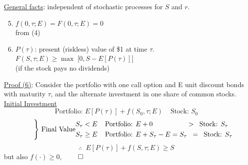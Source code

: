 \documentclass[
14pt,notheorems,hyperref={pdfauthor=whatever}
]{beamer}
\begin{document}
\begin{frame}
\underline{General facts}: independent of stochastic processes for $S$ and $r$.\\
\hfill
\begin{enumerate}
    \setcounter{enumi}{4}
    \item $f(0,\tau;E) = F(0,\tau;E) = 0$\\
    from (4)\\
    \hfill
    \item $P(\tau)$: present (riskless) value of \$1 at time $\tau$.\\
    $F(S,\tau;E) \geq \max\;\bigg[0,S-E[P(\tau)]\bigg]$\\
    (if the stock pays no dividends)\\
\end{enumerate}
\hfill\break
\end{frame}

\begin{frame}
\underline{Proof (6)}: Consider the portfolio with one call option and E unit discount bonds with maturity $\tau$, and the alternate investment in one share of common stocks.\\
\hfill\break
\underline{Initial Investment}
\[\text{Portfolio: } E[P(\tau)]+f(S_0,\tau;E) \;\;\;\; \text{Stock: } S_0\]
\begin{align*} \tag*{\Bigg\} Final Value}
\begin{split}
    S_\tau &< E \;\;\;\; \text{Portfolio: } E+0 \;\;\;\;\;\;\;\;\;\;\;\;\;\;\;\;\;\;>\;\; \text{Stock: } S_\tau
    \\
    S_\tau &\geq E \;\;\;\; \text{Portfolio: } E+S_\tau-E=S_\tau \;\;=\;\; \text{Stock: } S_\tau
\end{split}
\end{align*}
\[\therefore \;\; E[P(\tau)]+f(S,\tau;E) \geq S\]
but also $f(\cdot) \geq 0$, \hfill$\qed$\\
\end{frame}
\end{document}

